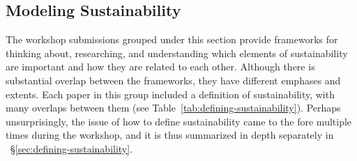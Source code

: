 \documentclass[11pt, oneside]{amsart}
\begin{document}
\subsection{Modeling Sustainability}

The workshop submissions grouped under this section provide frameworks
for thinking about, researching, and understanding which elements of
sustainability are important and how they are related to each other. Although there is
substantial overlap between the frameworks, they have different
emphases and extents.  Each paper in this group included a definition
of sustainability, with many overlaps between them (see
Table~\ref{tab:defining-sustainability}).  Perhaps unsurprisingly, the
issue of how to define sustainability came to the fore multiple times
during the workshop, and it is thus summarized in depth separately in
~\S\ref{sec:defining-sustainability}.
\end{document}
